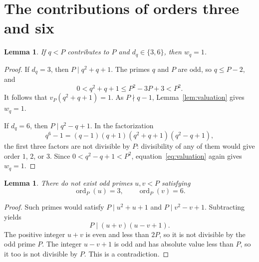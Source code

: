 \documentclass[11pt]{article}
\newtheorem{lemma}[theorem]{Lemma}
\theoremstyle{remark}
\DeclareMathOperator{\ord}{ord}
\begin{document}
\section{The contributions of orders three and six}

\begin{lemma}\label{lem:unit}
If $q<P$ contributes to $P$ and $d_q\in\{3,6\}$, then $w_q=1$.
\end{lemma}
\begin{proof}
If $d_q=3$, then $P\mid q^2+q+1$. The primes $q$ and $P$ are odd, so $q\le P-2$, and
\[
 0<q^2+q+1\le P^2-3P+3<P^2.
\]
It follows that $v_P(q^2+q+1)=1$. As $P\nmid q-1$, Lemma~\ref{lem:valuation} gives $w_q=1$.

If $d_q=6$, then $P\mid q^2-q+1$. In the factorization
\[
 q^6-1=(q-1)(q+1)(q^2+q+1)(q^2-q+1),
\]
the first three factors are not divisible by $P$: divisibility of any of them would give order $1$, $2$, or $3$. Since $0<q^2-q+1<P^2$, equation~\eqref{eq:valuation} again gives $w_q=1$.
\end{proof}

\begin{lemma}\label{lem:incompatible}
There do not exist odd primes $u,v<P$ satisfying
\[
 \ord_P(u)=3,\qquad \ord_P(v)=6.
\]
\end{lemma}
\begin{proof}
Such primes would satisfy $P\mid u^2+u+1$ and $P\mid v^2-v+1$. Subtracting yields
\[
 P\mid(u+v)(u-v+1).
\]
The positive integer $u+v$ is even and less than $2P$, so it is not divisible by the odd prime $P$. The integer $u-v+1$ is odd and has absolute value less than $P$, so it too is not divisible by $P$. This is a contradiction.
\end{proof}
\end{document}
